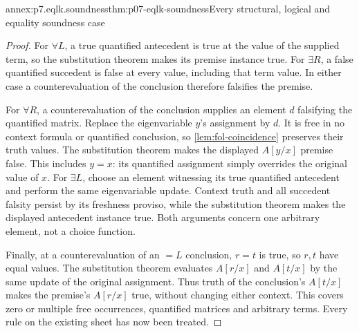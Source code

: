 \begin{annexitem}{annex:p7.eqlk.soundness}{thm:p07-eqlk-soundness}{Every structural, logical and equality soundness case}
\begin{proof}
For \(\forall L\), a true quantified antecedent is true at the value
of the supplied term, so the substitution theorem makes its premise
instance true. For \(\exists R\), a false quantified succedent is
false at every value, including that term value. In either case a
counterevaluation of the conclusion therefore falsifies the premise.

For \(\forall R\), a counterevaluation of the conclusion supplies an
element \(d\) falsifying the quantified matrix. Replace the eigenvariable
\(y\)'s assignment by \(d\). It is free in no context formula or
quantified conclusion, so \cref{lem:fol-coincidence} preserves their truth
values. The substitution theorem makes the displayed \(A[y/x]\)
premise false. This includes \(y=x\): its quantified assignment simply
overrides the original value of \(x\).
For \(\exists L\), choose an element witnessing its true quantified
antecedent and perform the same eigenvariable update. Context truth and
all succedent falsity persist by its freshness proviso, while the
substitution theorem makes the displayed antecedent instance true.
Both arguments concern one arbitrary element, not a choice function.

Finally, at a counterevaluation of an \(=L\) conclusion, \(r=t\)
is true, so \(r,t\) have equal values. The substitution theorem evaluates
\(A[r/x]\) and \(A[t/x]\) by the same update of the original
assignment. Thus truth of the conclusion's \(A[t/x]\) makes the
premise's \(A[r/x]\) true, without changing either context. This covers
zero or multiple free occurrences, quantified matrices and arbitrary
terms. Every rule on the existing sheet has now been treated.
\end{proof}
\end{annexitem}


